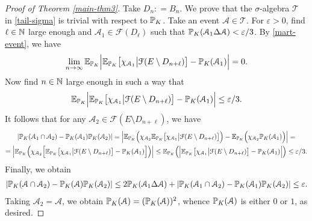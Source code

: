 \documentclass[12pt]{paper}
\numberwithin{theorem}{section}
\numberwithin{figure}{section}
\numberwithin{equation}{section}
\begin{document}
\begin{proof}[Proof of Theorem \ref{main-thm3}]
Take $D_n: = B_n$.  We prove that the $\sigma$-algebra $\mathscr{T}$ in \eqref{tail-sigma} is trivial with respect to $\mathbb{P}_K$.  Take an event $\mathcal{A} \in \mathscr{T}$.  For $\varepsilon >0$, find  $\ell \in \mathbb{N}$ large enough and $\mathcal{A}_1 \in \mathcal{F}(D_\ell)$ such that $\mathbb{P}_K (\mathcal{A}_1 \Delta \mathcal{A}) < \varepsilon/3$.
By \eqref{mart-event}, we have
\[
\lim_{n\to\infty} \mathbb{E}_{\mathbb{P}_K} \Big| \mathbb{E}_{\mathbb{P}_K}\big[\chi_{\mathcal{A}_1}   \big|\mathcal{F}(E\setminus D_{n+\ell}) \big]  - \mathbb{P}_{K} (\mathcal{A}_1)  \Big| = 0.
\]
 Now find $n \in \mathbb{N}$ large enough in such a way that
\begin{align*}
\mathbb{E}_{\mathbb{P}_K} \Big| \mathbb{E}_{\mathbb{P}_K}\big[\chi_{\mathcal{A}_1}   \big|\mathcal{F}(E\setminus D_{n+\ell}) \big]  - \mathbb{P}_{K} (\mathcal{A}_1)  \Big|  \le \varepsilon/3.
\end{align*}
It follows that  for any $\mathcal{A}_2 \in \mathcal{F} (E\setminus D_{n+\ell})$, we have
\begin{multline}
 | \mathbb{P}_K(\mathcal{A}_1 \cap \mathcal{A}_2)  - \mathbb{P}_K(\mathcal{A}_1) \mathbb{P}_K(\mathcal{A}_2) | = \Big| \mathbb{E}_{\mathbb{P}_K}    \Big(  \chi_{\mathcal{A}_2} \mathbb{E}_{\mathbb{P}_K}\big[\chi_{\mathcal{A}_1}   \big|\mathcal{F}(E\setminus D_{n+\ell}) \big]    \Big)   -   \mathbb{E}_{\mathbb{P}_K}    \Big(  \chi_{\mathcal{A}_2}  \mathbb{P}_{K} (\mathcal{A}_1)     \Big)   \Big|=
 \\
 = \Big| \mathbb{E}_{\mathbb{P}_K}    \Big(  \chi_{\mathcal{A}_2} \Big[\mathbb{E}_{\mathbb{P}_K}\big[\chi_{\mathcal{A}_1}   \big|\mathcal{F}(E\setminus D_{n+\ell}) \big]   - \mathbb{P}_{K} (\mathcal{A}_1) \Big]   \Big)     \Big|
  \le \mathbb{E}_{\mathbb{P}_K} \Big(\Big| \mathbb{E}_{\mathbb{P}_K}\big[\chi_{\mathcal{A}_1}   \big|\mathcal{F}(E\setminus D_{n+\ell}) \big]  - \mathbb{P}_{K} (\mathcal{A}_1)  \Big|\Big)  \le \varepsilon/3.
\end{multline}
Finally, we obtain
\begin{align*}
 | \mathbb{P}_K(\mathcal{A} \cap \mathcal{A}_2)  - \mathbb{P}_K(\mathcal{A}) \mathbb{P}_K(\mathcal{A}_2) | \le 2  \mathbb{P}_K (\mathcal{A}_1 \Delta \mathcal{A})  +   | \mathbb{P}_K(\mathcal{A}_1 \cap \mathcal{A}_2)  - \mathbb{P}_K(\mathcal{A}_1) \mathbb{P}_K(\mathcal{A}_2) | \le \varepsilon.
\end{align*}
Taking $\mathcal{A}_2 = \mathcal{A}$, we obtain $\mathbb{P}_K(\mathcal{A}) = (\mathbb{P}_K(\mathcal{A}))^2$, whence $\mathbb{P}_K(\mathcal{A})$ is either $0$ or $1$, as desired.
\end{proof}
\end{document}

